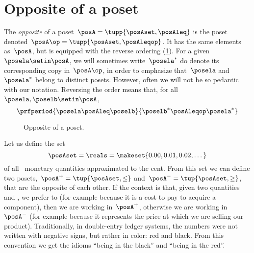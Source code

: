 
\section{Opposite of a poset}\label{sec:opposite-of-a-poset}

\begin{definition}
    \label{def:poset-opposite}
    The \emph{opposite} of a poset~$\posA=\tupp{\posAset, \posAleq}$ is the poset denoted~$\posA\op=\tupp{\posAset, \posAleqop}$.
    It has the same elements as~$\posA$, but is equipped with the reverse ordering (\cref{fig:poset-opposite}).
    For a given~$\posela \setin \posA$, we will sometimes write~$\posela^*$ do denote its corresponding copy in~$\posA\op$, in order to emphasize that~$\posela$ and~$\posela^*$ belong to distinct posets.
    However, often we will not be so pedantic with our notation.
    Reversing the order means that, for all~$\posela,\poselb \setin \posA$,
    \begin{equation*}
        \prfperiod{
            \posela \posAleq \poselb
        }{
            \poselb^* \posAleqop \posela^*
        }
    \end{equation*}
\end{definition}

\begin{figure}[tbh]
    \centering
    \caption{
        Opposite of a poset.
    }
    \label{fig:poset-opposite}
\end{figure}

\begin{example}
    Let us define the set
    \begin{equation*}
        \posAset=\reals=\makeset{0.00,0.01,0.02,\dots}
    \end{equation*}
    of all \CHFneutral \ monetary quantities approximated to the cent.
    From this set we can define two posets,~$\posA^{+} = \tup{\posAset, \leq}$ and~$\posA^{-} = \tup{\posAset, \geq}$, that are the opposite of each other.
    If the context is that, given two quantities \unit[1]{\CHFneutral} and \unit[2]{\CHFneutral}, we prefer \unit[1]{\CHFneutral} to \unit[2]{\CHFneutral} (for example because it is a cost to pay to acquire a component), then we are working in~$\posA^{+}$, otherwise we are working in~$\posA^{-}$ (for example because it represents the price at which we are selling our product).
    Traditionally, in double-entry ledger systems, the numbers were not written with negative signs, but rather in color: red and black.
    From this convention we get the idioms ``being in the black'' and ``being in the red''.
\end{example}
